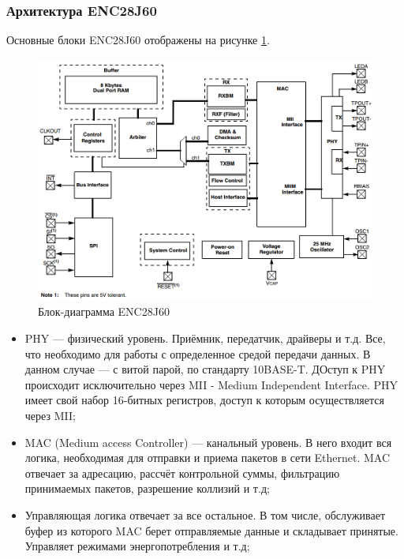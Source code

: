 \subsubsection{Архитектура ENC28J60}

Основные блоки ENC28J60 отображены на рисунке \ref{fig:encblocks}.

\begin{figure}[H]
	\centering
		\includegraphics[scale=0.5]{img/encblockdiagram.png}
	\caption{Блок-диаграмма ENC28J60\label{fig:encblocks} \cite{enc28j60datasheet}}
\end{figure}

\begin{itemize}
	\item PHY --- физический уровень. Приёмник, передатчик, драйверы и т.д. Все, что необходимо для работы с определенное средой передачи данных. В данном случае --- с витой парой, по стандарту 10BASE-T. ДОступ к PHY происходит исключительно через MII - Medium Independent Interface. PHY имеет свой набор 16-битных регистров, доступ к которым осуществляется через MII;
	\item MAC (Medium access Controller) --- канальный уровень. В него входит вся логика, необходимая для отправки и приема пакетов в сети Ethernet. MAC отвечает за адресацию, рассчёт контрольной суммы, фильтрацию принимаемых пакетов, разрешение коллизий и т.д;
	\item Управляющая логика отвечает за все остальное. В том числе, обслуживает буфер из которого MAC берет отправляемые данные и складывает принятые. Управляет режимами энергопотребления и т.д;
\end{itemize}

